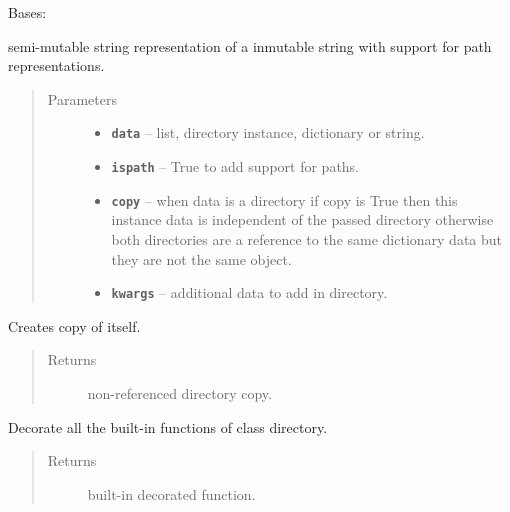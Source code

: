 \documentclass[letterpaper,10pt,english]{sphinxmanual}
\begin{document}
\begin{fulllineitems}
\label{RRtoolbox.lib:RRtoolbox.lib.directory.Directory}
Bases: 

semi-mutable string representation of a inmutable string with support for path representations.
\begin{quote}\begin{description}
\item[{Parameters}] \leavevmode\begin{itemize}
\item {} 
\textbf{\texttt{data}} -- list, directory instance, dictionary or string.

\item {} 
\textbf{\texttt{ispath}} -- True to add support for paths.

\item {} 
\textbf{\texttt{copy}} -- when data is a directory if copy is True then this instance data is independent
of the passed directory otherwise both directories are a reference to the same
dictionary data but they are not the same object.

\item {} 
\textbf{\texttt{kwargs}} -- additional data to add in directory.

\end{itemize}

\end{description}\end{quote}

\begin{fulllineitems}
\label{RRtoolbox.lib:RRtoolbox.lib.directory.Directory.copy}
Creates copy of itself.
\begin{quote}\begin{description}
\item[{Returns}] \leavevmode
non-referenced directory copy.

\end{description}\end{quote}

\end{fulllineitems}


\begin{fulllineitems}
\label{RRtoolbox.lib:RRtoolbox.lib.directory.Directory.correctSTRBuiltin}
Decorate all the built-in functions of class directory.
\begin{quote}\begin{description}
\item[{Returns}] \leavevmode
built-in decorated function.


\end{description}
\end{quote}
\end{fulllineitems}
\end{fulllineitems}
\end{document}
